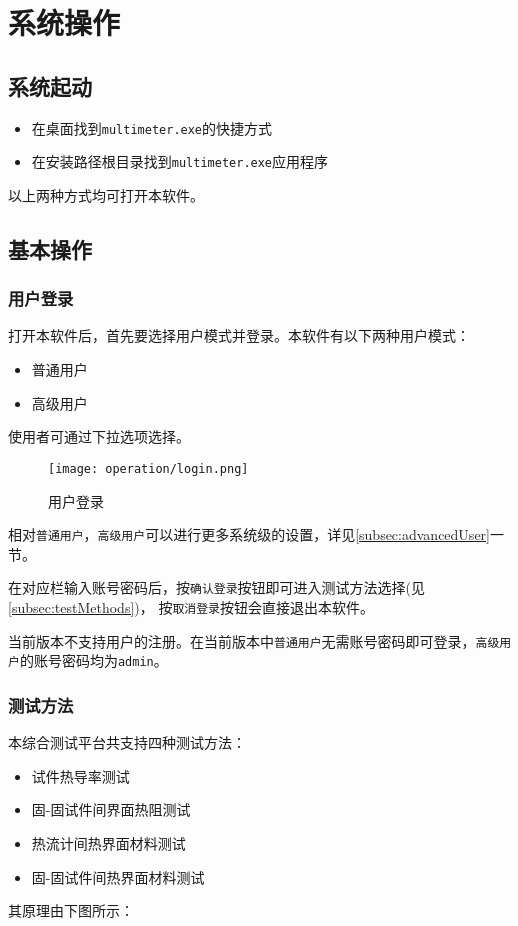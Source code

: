 \chapter{系统操作}
\section{系统起动}
\begin{itemize}
    \item 在桌面找到\lstinline{multimeter.exe}的快捷方式
    \item 在安装路径根目录找到\lstinline{multimeter.exe}应用程序
\end{itemize}
以上两种方式均可打开本软件。
\section{基本操作}
\subsection{用户登录}
打开本软件后，首先要选择用户模式并登录。本软件有以下两种用户模式：
\begin{itemize}
    \item 普通用户
    \item 高级用户
\end{itemize}
使用者可通过下拉选项选择。
\begin{figure}[htbp]
    \centering
    \texttt{[image: operation/login.png]}
    \caption{ 用户登录 \label{fig:login}}
\end{figure}    
相对\lstinline{普通用户}，\lstinline{高级用户}可以进行更多系统级的设置，详见\ref{subsec:advancedUser}一节。

在对应栏输入账号密码后，按\lstinline{确认登录}按钮即可进入测试方法选择(见\ref{subsec:testMethods})，
按\lstinline{取消登录}按钮会直接退出本软件。
\begin{note}
    当前版本不支持用户的注册。在当前版本中\lstinline{普通用户}无需账号密码即可登录，\lstinline{高级用户}的账号密码均为\lstinline{admin}。
\end{note}
\subsection{测试方法\label{subsec:testMethods}} 
本综合测试平台共支持四种测试方法：
\begin{itemize}
    \item 试件热导率测试
    \item 固-固试件间界面热阻测试
    \item 热流计间热界面材料测试
    \item 固-固试件间热界面材料测试
\end{itemize}
其原理由下图所示：

